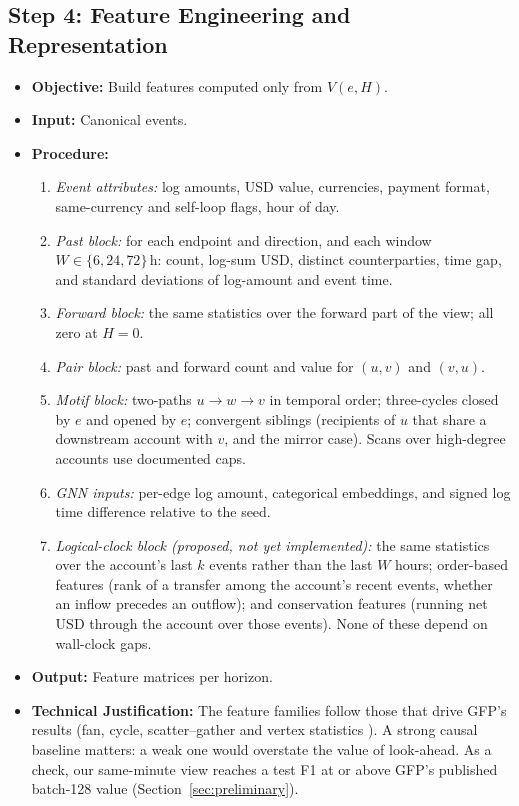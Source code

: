 \documentclass[11pt,a4paper]{article}
\begin{document}
\subsection{Step 4: Feature Engineering and Representation}
\begin{itemize}[leftmargin=*]
    \item \textbf{Objective:} Build features computed only from $V(e,H)$.
    \item \textbf{Input:} Canonical events.
    \item \textbf{Procedure:}
    \begin{enumerate}[leftmargin=*]
        \item \textit{Event attributes:} log amounts, USD value, currencies, payment format, same-currency and self-loop flags, hour of day.
        \item \textit{Past block:} for each endpoint and direction, and each window $W\in\{6, 24, 72\}$\,h: count, log-sum USD, distinct counterparties, time gap, and standard deviations of log-amount and event time.
        \item \textit{Forward block:} the same statistics over the forward part of the view; all zero at $H=0$.
        \item \textit{Pair block:} past and forward count and value for $(u,v)$ and $(v,u)$.
        \item \textit{Motif block:} two-paths $u\to w\to v$ in temporal order; three-cycles closed by $e$ and opened by $e$; convergent siblings (recipients of $u$ that share a downstream account with $v$, and the mirror case). Scans over high-degree accounts use documented caps.
        \item \textit{GNN inputs:} per-edge log amount, categorical embeddings, and signed log time difference relative to the seed.
        \item \textit{Logical-clock block (proposed, not yet implemented):} the same statistics over the account's last $k$ events rather than the last $W$ hours; order-based features (rank of a transfer among the account's recent events, whether an inflow precedes an outflow); and conservation features (running net USD through the account over those events). None of these depend on wall-clock gaps.
    \end{enumerate}
    \item \textbf{Output:} Feature matrices per horizon.
    \item \textbf{Technical Justification:} The feature families follow those that drive GFP's results (fan, cycle, scatter--gather and vertex statistics \cite{blanusa2024gfp}). A strong causal baseline matters: a weak one would overstate the value of look-ahead. As a check, our same-minute view reaches a test F1 at or above GFP's published batch-128 value (Section~\ref{sec:preliminary}).

\end{itemize}
\end{document}
